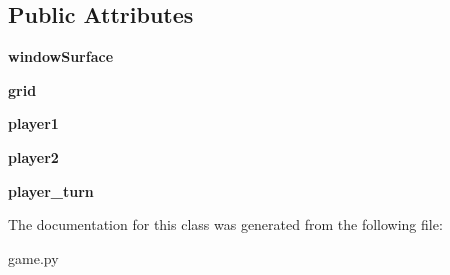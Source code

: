 \subsection*{Public Attributes}
\begin{DoxyCompactItemize}
\item 
\hypertarget{classgame_1_1Game_a7379d6f60c3dcd68c0edf0966c2d3697}{{\bfseries window\-Surface}}\label{classgame_1_1Game_a7379d6f60c3dcd68c0edf0966c2d3697}

\item 
\hypertarget{classgame_1_1Game_a52a8c922ba616a54f3b2c0579be1426d}{{\bfseries grid}}\label{classgame_1_1Game_a52a8c922ba616a54f3b2c0579be1426d}

\item 
\hypertarget{classgame_1_1Game_a7cbd49dcf3f748850547f453583934cf}{{\bfseries player1}}\label{classgame_1_1Game_a7cbd49dcf3f748850547f453583934cf}

\item 
\hypertarget{classgame_1_1Game_aee8634f00ac6fdb2e99cc4c5de8f79e6}{{\bfseries player2}}\label{classgame_1_1Game_aee8634f00ac6fdb2e99cc4c5de8f79e6}

\item 
\hypertarget{classgame_1_1Game_aec618842be48a9664204a012bec01321}{{\bfseries player\-\_\-turn}}\label{classgame_1_1Game_aec618842be48a9664204a012bec01321}

\end{DoxyCompactItemize}


The documentation for this class was generated from the following file\-:\begin{DoxyCompactItemize}
\item 
game.\-py\end{DoxyCompactItemize}
